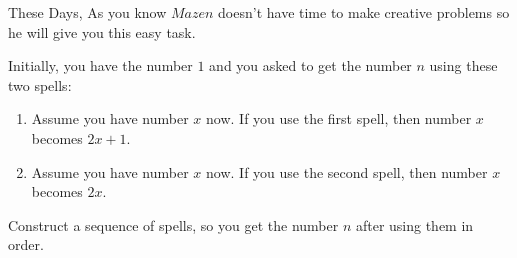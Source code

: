 These Days, As you know $Mazen$ doesn't have time to make creative problems so he will give you this easy task.

Initially, you have the number $1$ and you asked to get the number $n$ using these two spells:
\begin{enumerate}
  \item Assume you have number $x$ now. If you use the first spell, then number $x$
 becomes $2x+1$.
  \item Assume you have number $x$ now. If you use the second spell, then number $x$
 becomes $2x$.
\end{enumerate}
Construct a sequence of spells, so you get the number $n$ after using them in order.

